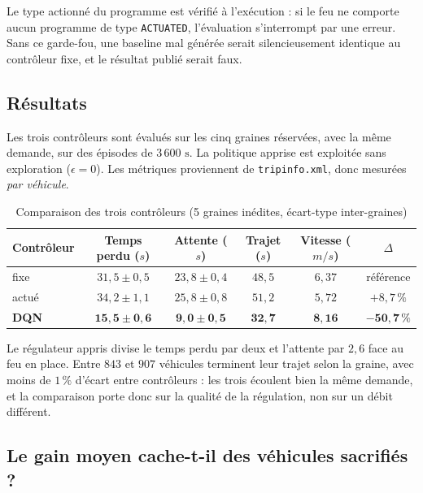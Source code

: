 \documentclass[11pt,a4paper]{article}
\begin{document}
Le type actionné du programme est vérifié à l'exécution : si le feu ne comporte aucun
programme de type \texttt{ACTUATED}, l'évaluation s'interrompt par une erreur. Sans ce
garde-fou, une baseline mal générée serait silencieusement identique au contrôleur
fixe, et le résultat publié serait faux.

\subsection{Résultats}

Les trois contrôleurs sont évalués sur les cinq graines réservées, avec la même
demande, sur des épisodes de $3\,600\text{ s}$. La politique apprise est exploitée
sans exploration ($\epsilon = 0$). Les métriques proviennent de
\texttt{tripinfo.xml}, donc mesurées \emph{par véhicule}.

\begin{table}[H]
\centering
\caption{Comparaison des trois contrôleurs (5 graines inédites, écart-type inter-graines)}
\label{tab:baselines}
\vspace{0.2cm}
\begin{tabular}{lccccc}
\toprule
\textbf{Contrôleur} & \textbf{Temps perdu ($s$)} & \textbf{Attente ($s$)} & \textbf{Trajet ($s$)} & \textbf{Vitesse ($m/s$)} & \textbf{$\Delta$} \\
\midrule
fixe   & $31{,}5 \pm 0{,}5$ & $23{,}8 \pm 0{,}4$ & $48{,}5$ & $6{,}37$ & référence \\
actué  & $34{,}2 \pm 1{,}1$ & $25{,}8 \pm 0{,}8$ & $51{,}2$ & $5{,}72$ & $+8{,}7\,\%$ \\
\textbf{DQN} & $\mathbf{15{,}5 \pm 0{,}6}$ & $\mathbf{9{,}0 \pm 0{,}5}$ & $\mathbf{32{,}7}$ & $\mathbf{8{,}16}$ & $\mathbf{-50{,}7\,\%}$ \\
\bottomrule
\end{tabular}
\end{table}

Le régulateur appris divise le temps perdu par deux et l'attente par $2{,}6$ face au
feu en place. Entre $843$ et $907$ véhicules terminent leur trajet selon la graine, avec
moins de $1\,\%$ d'écart entre contrôleurs : les trois écoulent bien la même demande,
et la comparaison porte donc sur la qualité de la régulation, non sur un débit
différent.

\subsection{Le gain moyen cache-t-il des véhicules sacrifiés ?}
\label{sec:queues}
\end{document}
